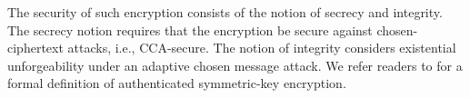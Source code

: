 The security of such encryption consists of the notion of secrecy and integrity. The secrecy notion requires that the encryption be secure against chosen-ciphertext attacks, i.e., CCA-secure. The notion of integrity considers existential unforgeability under an adaptive chosen message attack. We refer readers to \cite{KatzLindell2014} for a formal definition of authenticated symmetric-key encryption. 




